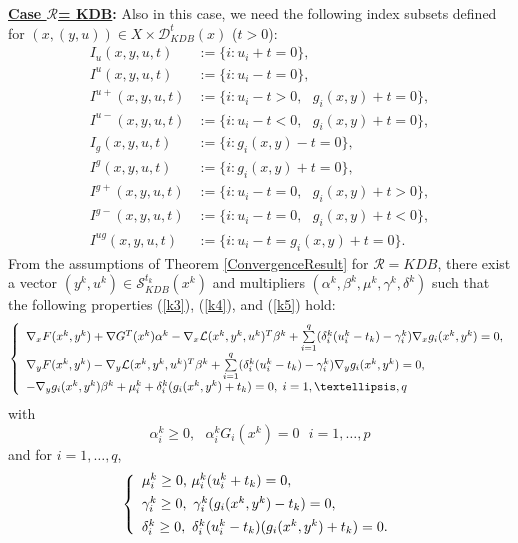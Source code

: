 \noindent \textbf{\underline{Case $ \mathcal{R}$= KDB}:} Also in this case, we need  the following index subsets  defined for
$(x,(y,u))\in X\times\mathcal{D}_{KDB}^{t}(x)$ ($t>0$):
\begin{align*}
I_{u}(x,y,u,t)  & :=\{i:  u_{i}+t=0\},\\
I^{u}(x,y,u,t)  & :=\{i: u_{i}-t=0\},\\
I^{u+}(x,y,u,t)  & :=\{i: u_{i}-t>0,\text{ }g_{i}(x,y)+t=0\},\\
I^{u-}(x,y,u,t)  & :=\{i: u_{i}-t<0,\text{\ }g_{i}(x,y)+t=0\},\\
I_{g}(x,y,u,t)  & :=\{i: g_{i}(x,y)-t=0\},\\
I^{g}(x,y,u,t)  & :=\{i: g_{i}(x,y)+t=0\},\\
I^{g+}(x,y,u,t)  & :=\{i: u_{i}-t=0,\text{ }g_{i}(x,y)+t>0\},\\
I^{g-}(x,y,u,t)  & :=\{i: u_{i}-t=0,\text{ }g_{i}(x,y)+t<0\},\\
I^{ug}(x,y,u,t)  & :=\{i: u_{i}-t=g_{i}(x,y)+t=0\}.
\end{align*}
From the assumptions of Theorem \ref{ConvergenceResult} for $\mathcal{R}=KDB$, there exist a vector
	$(y^{k},u^{k})\in\mathcal{S}_{KDB}^{t_{k}}(x^{k})$ and multipliers
	$(\alpha^{k},\beta^{k},\mu^{k},\gamma^{k},\delta^{k})$ such that the following
	properties (\ref{k3}), (\ref{k4}), and (\ref{k5}) hold: 
	\begin{equation}
	\left\{
	\begin{array}
	[c]{c}
	\nabla_{x}F(x^{k},y^{k})+\nabla G^{T}(x^{k})\alpha^{k}-\nabla_{x}
	\mathcal{L}(x^{k},y^{k},u^{k})^{T}\beta^{k}+\sum\limits_{i=1}^{q}(\delta
	_{i}^{k}(u_{i}^{k}-t_{k})-\gamma_{i}^{k})\nabla_{x}g_{i}(x^{k},y^{k})=0,\\[1ex]
	\multicolumn{1}{l}{\nabla_{y}F(x^{k},y^{k})-\nabla_{y}\mathcal{L}(x^{k}
		,y^{k},u^{k})^{T}\beta^{k}+\sum\limits_{i=1}^{q}(\delta_{i}^{k}(u_{i}
		^{k}-t_{k})-\gamma_{i}^{k})\nabla_{y}g_{i}(x^{k},y^{k})=0,}\\[1ex]
	\multicolumn{1}{l}{-\nabla_{y}g_{i}(x^{k},y^{k})\beta^{k}+\mu_{i}^{k}
		+\delta_{i}^{k}(g_{i}(x^{k},y^{k})+t_{k})=0,\;i=1,\ldots,q}
	\end{array}
	\right. \label{k3}
	\end{equation}
	with
	\begin{equation}
	\alpha_{i}^{k}\geq0,\text{ }\alpha_{i}^{k}G_{i}(x^{k}
	)=0\ \ \ i=1,\ldots,p\label{k4}
	\end{equation}
	and for $i=1,\ldots,q$,
	\begin{equation}
	\left\{
	\begin{array}[l]{l}
	\mu_{i}^{k}\geq0\text{, }\mu_{i}^{k}(u_{i}^{k}+t_{k})=0,\\[1ex]
	\gamma_{i}^{k}\geq0,\text{ }\gamma_{i}^{k}(g_{i}(x^{k},y^{k})-t_{k}
	)=0,\\[1ex]
	\delta_{i}^{k}\geq0,\text{ }\delta_{i}^{k}(u_{i}^{k}-t_{k})(g_{i}(x^{k}
	,y^{k})+t_{k})=0.
	\end{array}
	\right. \label{k5}
	\end{equation}
